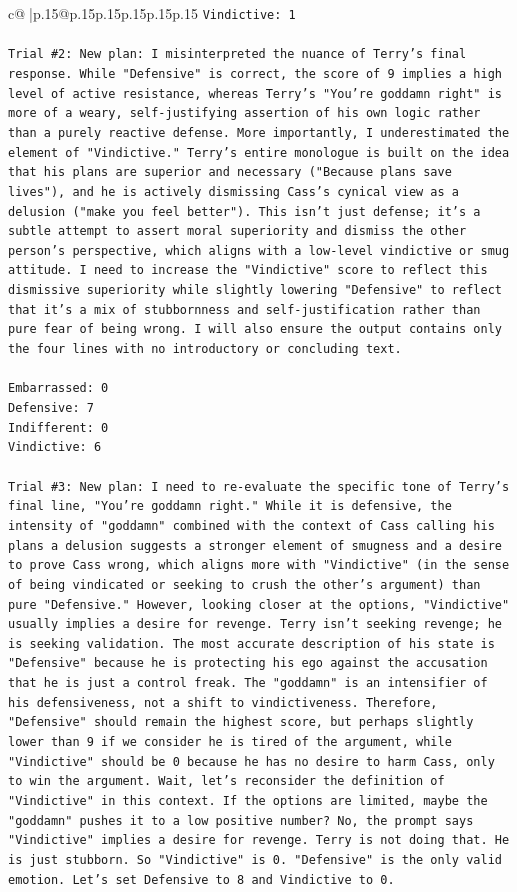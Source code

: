 \documentclass{article}
\begin{document}
{\begin{supertabular}{c@{$\;$}|p{.15\linewidth}@{}p{.15\linewidth}p{.15\linewidth}p{.15\linewidth}p{.15\linewidth}p{.15\linewidth}}
{{{\texttt{Vindictive: 1} \\
\\ 
\texttt{Trial \#2: New plan: I misinterpreted the nuance of Terry's final response. While "Defensive" is correct, the score of 9 implies a high level of active resistance, whereas Terry's "You're goddamn right" is more of a weary, self{-}justifying assertion of his own logic rather than a purely reactive defense. More importantly, I underestimated the element of "Vindictive." Terry's entire monologue is built on the idea that his plans are superior and necessary ("Because plans save lives"), and he is actively dismissing Cass's cynical view as a delusion ("make you feel better"). This isn't just defense; it's a subtle attempt to assert moral superiority and dismiss the other person's perspective, which aligns with a low{-}level vindictive or smug attitude. I need to increase the "Vindictive" score to reflect this dismissive superiority while slightly lowering "Defensive" to reflect that it's a mix of stubbornness and self{-}justification rather than pure fear of being wrong. I will also ensure the output contains only the four lines with no introductory or concluding text.} \\
\\ 
\texttt{Embarrassed: 0} \\
\texttt{Defensive: 7} \\
\texttt{Indifferent: 0} \\
\texttt{Vindictive: 6} \\
\\ 
\texttt{Trial \#3: New plan: I need to re{-}evaluate the specific tone of Terry's final line, "You're goddamn right." While it is defensive, the intensity of "goddamn" combined with the context of Cass calling his plans a delusion suggests a stronger element of smugness and a desire to prove Cass wrong, which aligns more with "Vindictive" (in the sense of being vindicated or seeking to crush the other's argument) than pure "Defensive." However, looking closer at the options, "Vindictive" usually implies a desire for revenge. Terry isn't seeking revenge; he is seeking validation. The most accurate description of his state is "Defensive" because he is protecting his ego against the accusation that he is just a control freak. The "goddamn" is an intensifier of his defensiveness, not a shift to vindictiveness. Therefore, "Defensive" should remain the highest score, but perhaps slightly lower than 9 if we consider he is tired of the argument, while "Vindictive" should be 0 because he has no desire to harm Cass, only to win the argument. Wait, let's reconsider the definition of "Vindictive" in this context. If the options are limited, maybe the "goddamn" pushes it to a low positive number? No, the prompt says "Vindictive" implies a desire for revenge. Terry is not doing that. He is just stubborn. So "Vindictive" is 0. "Defensive" is the only valid emotion. Let's set Defensive to 8 and Vindictive to 0.} \\
}}}
\end{supertabular}}
\end{document}
